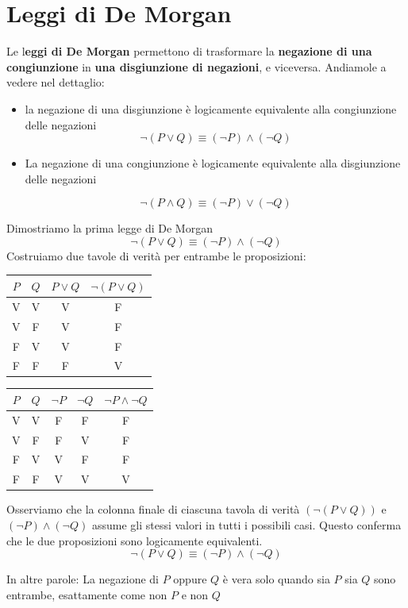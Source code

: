 \section{Leggi di De Morgan}
Le l\textbf{eggi di De Morgan} permettono di trasformare la\textbf{ negazione di una congiunzione} in \textbf{una disgiunzione di negazioni}, e viceversa. Andiamole a vedere nel dettaglio: 

\begin{itemize}
    \item la negazione di una disgiunzione è logicamente equivalente alla congiunzione delle negazioni
   \[
    \neg \left(P \lor Q\right) \equiv  \left(\neg P \right) \land (\neg Q)
    \]


    \item La negazione di una congiunzione è logicamente equivalente alla disgiunzione delle negazioni

\[
    \neg \left(P \land Q\right) \equiv  \left(\neg P \right) \lor (\neg Q)
\]

\end{itemize}




\begin{esempio} Dimostriamo la prima legge di  De Morgan
\[
\neg (P \lor Q) \equiv (\neg P) \land (\neg Q)
\]
Costruiamo due tavole di verità per entrambe le proposizioni:
\begin{center}
\begin{tabular}{c|c|c|c}
  \(P\) & \(Q\) & \(P \lor Q\) & \(\neg (P \lor Q)\)  \\
  \hline
  V & V & V & F \\
  V & F & V & F\\
  F & V & V & F  \\
  F & F & F & V  \\
\end{tabular}
\end{center}

\begin{center}
\begin{tabular}{c|c|c|c|c}
  \(P\) & \(Q\) & \(\neg P\) & \(\neg Q\) &  \(\neg P \land \neg Q\) \\
  \hline
  V & V & F & F & F \\
  V & F & F & V & F  \\
  F & V & V & F & F  \\
  F & F & V & V & V  \\
\end{tabular}
\end{center}

Osserviamo che la colonna finale di ciascuna tavola di verità \( (\neg \left(P \lor Q\right) )\) e  \( (\neg P) \land (\neg Q)\) assume gli stessi valori in tutti i possibili casi. Questo conferma che le due proposizioni sono logicamente equivalenti.
\[
\neg (P \lor Q) \equiv (\neg P) \land (\neg Q)
\]

In altre parole:  La negazione di \(P\) oppure \(Q\) è vera solo quando sia \(P\) sia \(Q\) sono entrambe, esattamente come  non \(P\) e non \(Q\)
\end{esempio} 






